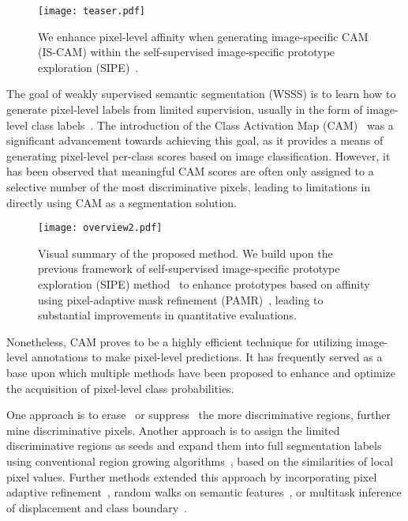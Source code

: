 \documentclass{article}
\begin{document}
\begin{figure}[t]
  \centering
  \texttt{[image: teaser.pdf]}
   \caption{We enhance pixel-level affinity when generating image-specific CAM (IS-CAM) within the self-supervised image-specific prototype exploration (SIPE)~\cite{SIPE}.}
   \label{fig:teaser}
\end{figure}

The goal of weakly supervised semantic segmentation (WSSS) is to learn how to generate pixel-level labels from limited supervision, usually in the form of image-level class labels~\cite{Hong_SigProcMag}. 
The introduction of the Class Activation Map (CAM)~\cite{CAM} was a significant advancement towards achieving this goal, as it provides a means of generating pixel-level per-class scores based on image classification.
However, it has been observed that meaningful CAM scores are often only assigned to a selective number of the most discriminative pixels, leading to limitations in directly using CAM as a segmentation solution.

\begin{figure*}[htb]
  \centering
  \centerline{\texttt{[image: overview2.pdf]}}
\caption{Visual summary of the proposed method. We build upon the previous framework of self-supervised image-specific prototype exploration (SIPE) method~\cite{SIPE} to enhance prototypes based on affinity using pixel-adaptive mask refinement (PAMR)~\cite{PAMR}, leading to substantial improvements in quantitative evaluations.}
\label{fig:overview}
\end{figure*}

Nonetheless, CAM proves to be a highly efficient technique for utilizing image-level annotations to make pixel-level predictions. 
It has frequently served as a base upon which multiple methods have been proposed to enhance and optimize the acquisition of pixel-level class probabilities.

One approach is to erase~\cite{AE} or suppress~\cite{DRS} the more discriminative regions, further mine discriminative pixels.
Another approach is to assign the limited discriminative regions as seeds and expand them into full segmentation labels using conventional region growing algorithms~\cite{SeedExpand,DSRG}, based on the similarities of local pixel values.
Further methods extended this approach by incorporating pixel adaptive refinement~\cite{PAMR}, random walks on semantic features~\cite{AffinityNet}, or multitask inference of displacement and class boundary~\cite{AffinityNet,IRN}.
\end{document}
